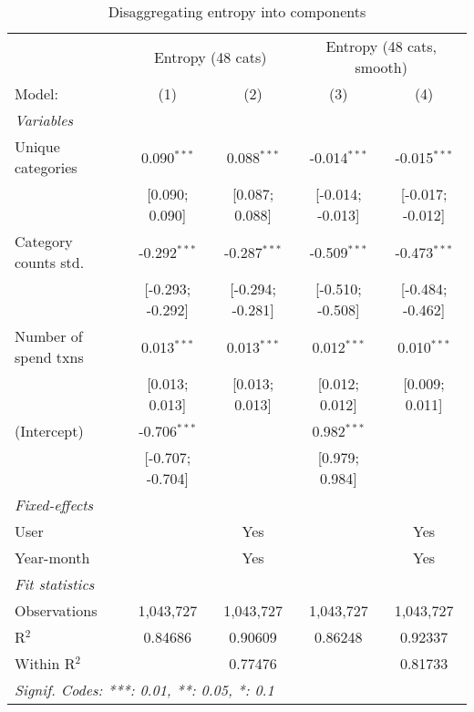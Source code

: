 
\begin{table}[htbp]
   \centering
   \tiny
   \begin{threeparttable}[b]
      \caption{\label{tab:reg_comp_only} Disaggregating entropy into components}
      \begin{tabular}{lcccc}
         \tabularnewline \midrule \midrule
          & \multicolumn{2}{c}{Entropy (48 cats)} & \multicolumn{2}{c}{Entropy (48 cats, smooth)} \\ 
         Model:               & (1)              & (2)              & (3)              & (4)\\  
         \midrule
         \emph{Variables}\\
         Unique categories    & 0.090$^{***}$    & 0.088$^{***}$    & -0.014$^{***}$   & -0.015$^{***}$\\   
                              & [0.090; 0.090]   & [0.087; 0.088]   & [-0.014; -0.013] & [-0.017; -0.012]\\   
         Category counts std. & -0.292$^{***}$   & -0.287$^{***}$   & -0.509$^{***}$   & -0.473$^{***}$\\   
                              & [-0.293; -0.292] & [-0.294; -0.281] & [-0.510; -0.508] & [-0.484; -0.462]\\   
         Number of spend txns & 0.013$^{***}$    & 0.013$^{***}$    & 0.012$^{***}$    & 0.010$^{***}$\\   
                              & [0.013; 0.013]   & [0.013; 0.013]   & [0.012; 0.012]   & [0.009; 0.011]\\   
         (Intercept)          & -0.706$^{***}$   &                  & 0.982$^{***}$    &   \\   
                              & [-0.707; -0.704] &                  & [0.979; 0.984]   &   \\   
         \midrule
         \emph{Fixed-effects}\\
         User                 &                  & Yes              &                  & Yes\\  
         Year-month           &                  & Yes              &                  & Yes\\  
         \midrule
         \emph{Fit statistics}\\
         Observations         & 1,043,727        & 1,043,727        & 1,043,727        & 1,043,727\\  
         R$^2$                & 0.84686          & 0.90609          & 0.86248          & 0.92337\\  
         Within R$^2$         &                  & 0.77476          &                  & 0.81733\\  
         \midrule \midrule
         \multicolumn{5}{l}{\emph{Signif. Codes: ***: 0.01, **: 0.05, *: 0.1}}\\
      \end{tabular}
   \end{threeparttable}
\end{table}


